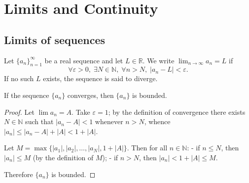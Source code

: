 \section{\texorpdfstring{Limits and Continuity}{Limits and Continuity}}

\subsection{\texorpdfstring{Limits of sequences}{Limits of sequences}}

\begin{definition}\label{def:seq_limit}
Let $\{a_n\}_{n=1}^{\infty}$ be a real sequence and let $L \in \mathbb{R}$. We write $\displaystyle\lim_{n\to\infty} a_n = L$ if
\[\forall \varepsilon > 0,\; \exists N \in \mathbb{N},\; \forall n > N,\; |a_n - L| < \varepsilon.\]
If no such $L$ exists, the sequence is said to diverge.
\end{definition}

\begin{proposition}\label{prop:convergent_bounded}
If the sequence $\{a_n\}$ converges, then $\{a_n\}$ is bounded.
\end{proposition}

\begin{proof}
Let $\lim a_n = A$. Take $\varepsilon = 1$; by the definition of convergence there exists $N \in \mathbb{N}$ such that $|a_n - A| < 1$ whenever $n > N$, whence $|a_n| \le |a_n - A| + |A| < 1 + |A|$.

Let $M = \max\{|a_1|, |a_2|, \dots, |a_N|, 1 + |A|\}$. Then for all $n \in \mathbb{N}$:
- if $n \le N$, then $|a_n| \le M$ (by the definition of $M$);
- if $n > N$, then $|a_n| < 1 + |A| \le M$.

Therefore $\{a_n\}$ is bounded.
\end{proof}

